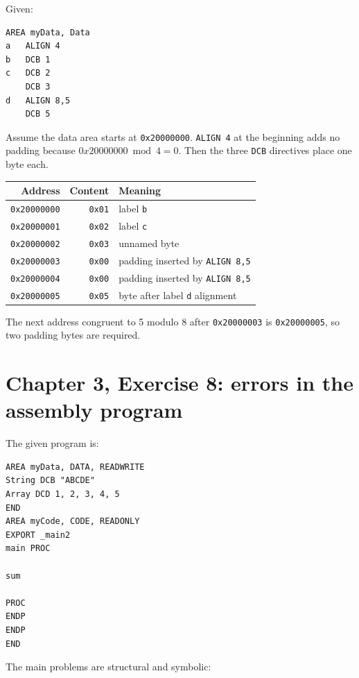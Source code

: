 \documentclass[11pt]{article}
\newcommand{\code}[1]{\texttt{#1}}
\begin{document}
Given:

\begin{Verbatim}[fontsize=\small]
AREA myData, Data
a   ALIGN 4
b   DCB 1
c   DCB 2
    DCB 3
d   ALIGN 8,5
    DCB 5
\end{Verbatim}

Assume the data area starts at \code{0x20000000}. \code{ALIGN 4} at the beginning adds no padding because \(0x20000000 \bmod 4 = 0\). Then the three \code{DCB} directives place one byte each.

\begin{center}
\begin{tabular}{r r l}
Address & Content & Meaning \\
\hline
\code{0x20000000} & \code{0x01} & label \code{b} \\
\code{0x20000001} & \code{0x02} & label \code{c} \\
\code{0x20000002} & \code{0x03} & unnamed byte \\
\code{0x20000003} & \code{0x00} & padding inserted by \code{ALIGN 8,5} \\
\code{0x20000004} & \code{0x00} & padding inserted by \code{ALIGN 8,5} \\
\code{0x20000005} & \code{0x05} & byte after label \code{d} alignment \\
\end{tabular}
\end{center}

The next address congruent to 5 modulo 8 after \code{0x20000003} is \code{0x20000005}, so two padding bytes are required.

\section*{Chapter 3, Exercise 8: errors in the assembly program}

The given program is:

\begin{Verbatim}[fontsize=\small]
AREA myData, DATA, READWRITE
String DCB "ABCDE"
Array DCD 1, 2, 3, 4, 5
END
AREA myCode, CODE, READONLY
EXPORT _main2
main PROC

sum

PROC
ENDP
ENDP
END
\end{Verbatim}

The main problems are structural and symbolic:
\end{document}
